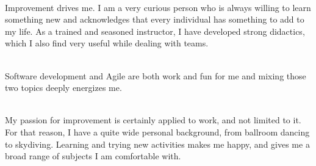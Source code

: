 \documentclass[a4paper, 10pt, onecolumn, oneside]{report}
\begin{document}
\\Improvement drives me. I am a very curious person who is always willing to learn something new and acknowledges that every individual has something to add to my life. As a trained and seasoned instructor, I have developed strong didactics, which I also find very useful while dealing with teams.

\\Software development and Agile are both work and fun for me and mixing those two topics deeply energizes me.

\\My passion for improvement is certainly applied to work, and not limited to it. For that reason, I have a quite wide personal background, from ballroom dancing to skydiving. Learning and trying new activities makes me happy, and gives me a broad range of subjects I am comfortable with. 
\end{document}
